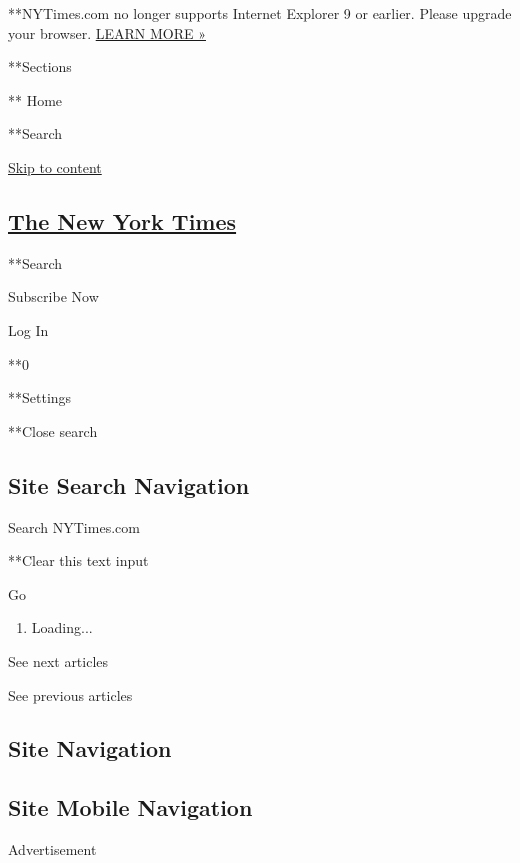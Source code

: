  **NYTimes.com no longer supports Internet Explorer 9 or earlier. Please
upgrade your browser.
\href{//www.nytimes3xbfgragh.onion/content/help/site/ie9-support.html}{LEARN
MORE »}

**Sections

** Home

**Search

\protect\hyperlink{main}{Skip to content}

\hypertarget{the-new-york-times}{%
\subsection{\texorpdfstring{\href{//www.nytimes3xbfgragh.onion/}{The New
York Times}}{The New York Times}}\label{the-new-york-times}}

**Search

Subscribe Now

Log In

**0

**Settings

**Close search

\hypertarget{site-search-navigation}{%
\subsection{Site Search Navigation}\label{site-search-navigation}}

Search NYTimes.com

**Clear this text input

Go

\begin{enumerate}
\def\labelenumi{\arabic{enumi}.}
\item
  Loading...
\end{enumerate}

See next articles

See previous articles

\hypertarget{site-navigation}{%
\subsection{Site Navigation}\label{site-navigation}}

\hypertarget{site-mobile-navigation}{%
\subsection{Site Mobile Navigation}\label{site-mobile-navigation}}

Advertisement

